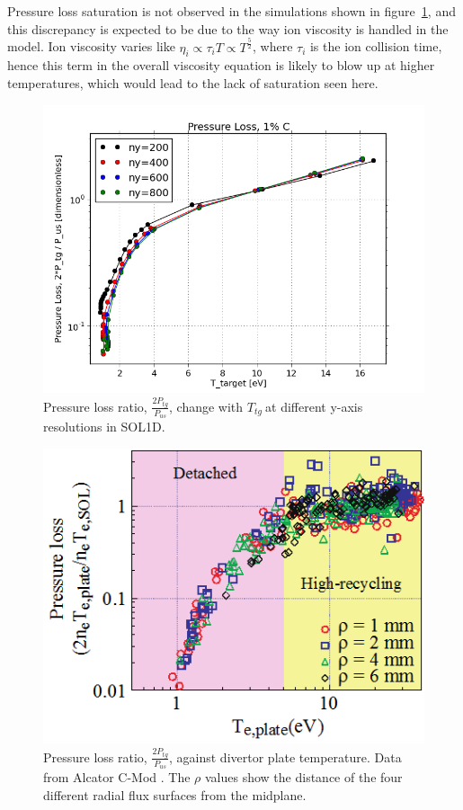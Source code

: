 \documentclass[12pt]{article}  %
\providecommand{\Ttg}{$T_{tg}~$} %
\begin{document}
Pressure loss saturation is not observed in the simulations shown in figure~\ref{figPL_IMPCOMBO2logy}, and this discrepancy is expected to be due to the way ion viscosity is handled in the model. Ion viscosity varies like $\eta_i \propto \tau_i T \propto T^{\frac{5}{2}}$, where $\tau_i$ is the ion collision time, hence this term in the overall viscosity equation is likely to blow up at higher temperatures, which would lead to the lack of saturation seen here. 

\begin{figure}
\includegraphics[scale=0.5]{Figures/sol1d/PL_IMPCOMBO2logy.png}
\centering
\caption{Pressure loss ratio, $\frac{2P_{tg}}{P_{us}}$, change with \Ttg at different y-axis resolutions in SOL1D.}\label{figPL_IMPCOMBO2logy}
\end{figure}

\begin{figure}
\includegraphics[scale=0.7]{Figures/PlossAlcator.png}
\centering
\caption{Pressure loss ratio, $\frac{2P_{tg}}{P_{us}}$, against divertor plate temperature. Data from Alcator C-Mod \cite{Lipschultz2007}. The $\rho $ values show the distance of the four different radial flux surfaces from the midplane.}\label{figPlossAlcator}
\end{figure}
\end{document}
